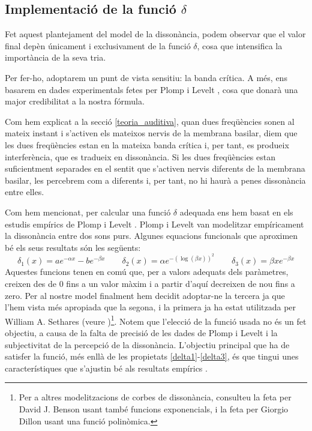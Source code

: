 \documentclass{article}
\theoremstyle{math}
\theoremstyle{TheoremNum}
\newcommand{\0}{\ensuremath{\vb{0}}}
\begin{document}
\subsection{Implementació de la funció \texorpdfstring{$\delta$}{delta}} 
Fet aquest plantejament del model de la dissonància, podem observar que el valor final depèn únicament i exclusivament de la funció $\delta$, cosa que intensifica la importància de la seva tria.\par
Per fer-ho, adoptarem un punt de vista sensitiu: la banda crítica. A més, ens basarem en dades experimentals fetes per Plomp i Levelt \cite{plomp}, cosa que donarà una major credibilitat a la nostra fórmula.\par Com hem explicat a la secció \ref{teoria_auditiva}, quan dues freqüències sonen al mateix instant i s'activen els mateixos nervis de la membrana basilar, diem que les dues freqüències estan en la mateixa banda crítica i, per tant, es produeix interferència, que es tradueix en dissonància. Si les dues freqüències estan suficientment separades en el sentit que s'activen nervis diferents de la membrana basilar, les percebrem com a diferents i, per tant, no hi haurà a penes dissonància entre elles.\par 
Com hem mencionat, per calcular una funció $\delta$ adequada ens hem basat en els estudis empírics de Plomp i Levelt \cite{plomp}. Plomp i Levelt van modelitzar empíricament la dissonància entre dos sons purs. Algunes equacions funcionals que aproximen bé els seus resultats són les següents: $$\delta_1(x)=ae^{-\alpha x}-be^{-\beta x}\qquad\delta_2(x)=\alpha e^{-\left(\log(\beta x)\right)^2}\qquad\delta_3(x)=\beta xe^{-\beta x}$$
Aquestes funcions tenen en comú que, per a valors adequats dels paràmetres, creixen des de 0 fins a un valor màxim i a partir d'aquí decreixen de nou fins a zero. Per al nostre model finalment hem decidit adoptar-ne la tercera ja que l'hem vista més apropiada que la segona, i la primera ja ha estat utilitzada per William A. Sethares (veure \cite{sethares1})\footnote{Per a altres modelitzacions de corbes de dissonància, consulteu la feta per David J. Benson \cite{benson} usant també funcions exponencials, i la feta per Giorgio Dillon \cite{dillon} usant una funció polinòmica.}. Notem que l'elecció de la funció usada no és un fet objectiu, a causa de la falta de precisió de les dades de Plomp i Levelt i la subjectivitat de la percepció de la dissonància. L'objectiu principal que ha de satisfer la funció, més enllà de les propietats \ref{delta1}-\ref{delta3}, és que tingui unes característiques que s'ajustin bé als resultats empírics \cite{benson}.\par
\end{document}
